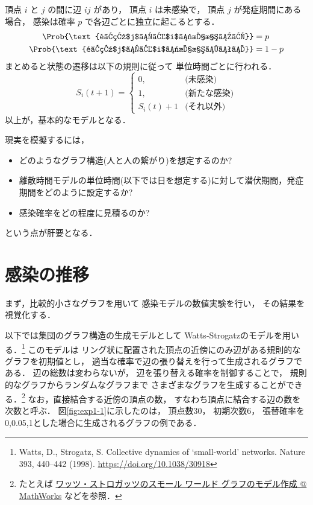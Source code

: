 \documentclass[10pt,oneside,fleqn]{scrartcl}
\begin{document}
頂点 \(i\) と \(j\) の間に辺 \(ij\) があり，
頂点 \(i\) は未感染で，
頂点 \(j\) が発症期間にある場合，
感染は確率 \(p\) で各辺ごとに独立に起こるとする．
\begin{align}
  \Prob{\text{頂点$j$から$i$に感染する}} &=p\\
  \Prob{\text{頂点$j$から$i$に感染しない}}&=1-p
\end{align}
まとめると状態の遷移は以下の規則に従って
単位時間ごとに行われる．
\begin{equation}
  S_{i}(t{+}1)
  =
  \begin{cases}
    0,&\text{(未感染)}\\
    1,&\text{(新たな感染)}\\
    S_{i}(t)+1&\text{(それ以外)}
  \end{cases}
\end{equation}
以上が，基本的なモデルとなる．

現実を模擬するには，
\begin{itemize}
\item どのようなグラフ構造(人と人の繋がり)を想定するのか?
\item 離散時間モデルの単位時間(以下では日を想定する)に対して潜伏期間，発症期間をどのように設定するか?
\item 感染確率をどの程度に見積るのか?
\end{itemize}
という点が肝要となる．

\section{感染の推移}
\label{sec:orgc79939e}

まず，比較的小さなグラフを用いて
感染モデルの数値実験を行い，
その結果を視覚化する．

\begin{figure*}%
  \centering
\end{figure*}

以下では集団のグラフ構造の生成モデルとして
Watts-Strogatzのモデルを用いる．\footnote{Watts, D., Strogatz, S. Collective dynamics of ‘small-world’ networks. Nature 393, 440–442 (1998). \url{https://doi.org/10.1038/30918}}
このモデルは
リング状に配置された頂点の近傍にのみ辺がある規則的なグラフを初期値とし，
適当な確率で辺の張り替えを行って生成されるグラフである．
辺の総数は変わらないが，
辺を張り替える確率を制御することで，
規則的なグラフからランダムなグラフまで
さまざまなグラフを生成することができる．\footnote{たとえば \href{https://jp.mathworks.com/help/matlab/math/build-watts-strogatz-small-world-graph-model.html}{ワッツ・ストロガッツのスモール ワールド グラフのモデル作成 @ MathWorks} 
などを参照．}
なお，直接結合する近傍の頂点の数，
すなわち頂点に結合する辺の数を次数と呼ぶ．
図\ref{fig:exp1-1}に示したのは，
頂点数30，
初期次数6，
張替確率を0,0.05,1とした場合に生成されるグラフの例である．
\end{document}

